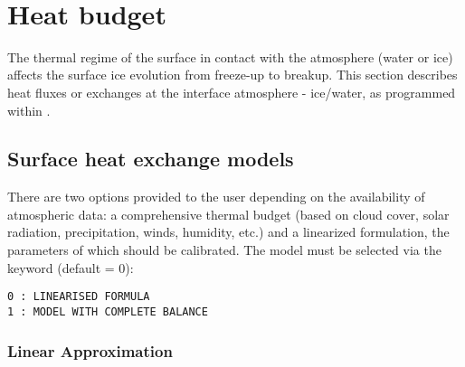  \renewcommand{\labelitemi}{$\rhd$}

~\newline
\chapter{Heat budget}
\label{chapter:heat_exchanges}
The thermal regime of the surface in contact with the atmosphere (water or ice) affects the surface ice evolution from freeze-up to breakup. This section describes heat fluxes or exchanges at the interface atmosphere - ice/water, as programmed within \khione.

\section{Surface heat exchange models}

There are two options provided to the user depending on the availability of atmospheric data: a comprehensive thermal budget (based on cloud cover, solar radiation, precipitation, winds, humidity, etc.) and a linearized formulation, the parameters of which should be calibrated.
The model must be selected via the keyword  (default = 0):
\begin{lstlisting}
0 : LINEARISED FORMULA
1 : MODEL WITH COMPLETE BALANCE
\end{lstlisting}


\subsection{Linear Approximation}

